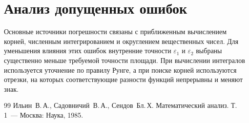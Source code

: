 \documentclass[a4paper,12pt,titlepage,finall]{article}
\begin{document}
\newpage

\section{Анализ допущенных ошибок}

Основные источники погрешности связаны с приближенным вычислением корней,
численным интегрированием и округлением вещественных чисел. Для уменьшения
влияния этих ошибок внутренние точности $\varepsilon_1$ и $\varepsilon_2$
выбраны существенно меньше требуемой точности площади. При вычислении
интегралов используется уточнение по правилу Рунге, а при поиске корней
используются отрезки, на которых соответствующие разности функций
непрерывны и меняют знак.

\newpage
\begin{raggedright}
\begin{thebibliography}{99}
 Ильин~В.\,А., Садовничий~В.\,А., Сендов~Бл.\,Х. Математический анализ. Т.\,1~---
    Москва: Наука, 1985.
\end{thebibliography}
\end{raggedright}
\end{document}
